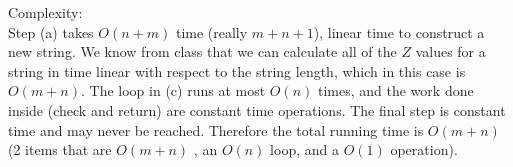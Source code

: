 \documentclass[11pt, oneside]{article}   	%
\begin{document}
\begin{enumerate}
{\Large Complexity:}\\
Step (a) takes $O(n+m)$ time (really $m+n+1$), linear time to construct a new string. 
We know from class that we can calculate all of the $Z$ values for a string in time linear with respect to the string length, which in this case is $O(m+n)$. 
The loop in (c) runs at most $O(n)$ times, and the work done inside (check and return) are constant time operations. 
The final step is constant time and may never be reached. 
Therefore the total running time is $O(m+n)$ (2 items that are $O(m+n)$ , an $O(n)$ loop, and a $O(1)$ operation). 

\end{enumerate}
\end{document}
